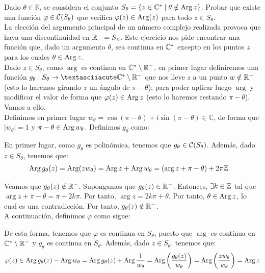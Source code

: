\begin{ejercicio}\label{ej:2.2}
    Dado $\theta \in \mathbb{R}$, se considera el conjunto $S_\theta = \{z \in \mathbb{C}^\ast \mid \theta \notin \operatorname{Arg} z\}$. Probar que existe una función $\varphi \in \mathcal{C}(S_\theta)$ que verifica $\varphi(z) \in \operatorname{Arg} (z)$ para todo $z \in S_\theta$.\\

    La elección del argumento principal de un número complejo realizada provoca que haya una discontinuidad en $\mathbb{R}^-=S_{\pi}$. Este ejercicio nos pide encontrar una función que, dado un argumento $\theta$, sea continua en $\mathbb{C}^*$ excepto en los puntos $z$ para los cuales $\theta\in \operatorname{Arg} z$.\\

    Dado $z\in S_{\theta}$, como $\arg$ es continua en $\mathbb{C}^\ast\setminus \mathbb{R}^-$, en primer lugar definiremos una función $g_{\theta}:S_{\theta}\to ´\bb{C}^{\ast}\setminus \bb{R}^-$ que nos lleve $z$ a un punto $w\notin \mathbb{R}^-$ (esto lo haremos girando $z$ un ángulo de $\pi-\theta$); para poder aplicar luego $\arg$ y modificar el valor de forma que $\varphi(z)\in \operatorname{Arg} z$ (esto lo haremos restando $\pi-\theta$). Vamos a ello.\\

    Definimos en primer lugar $w_\theta=\cos(\pi-\theta) + i\sin(\pi-\theta)\in \mathbb{C}$, de forma que $|w_\theta|=1$ y $\pi-\theta\in \operatorname{Arg} w_\theta$. Definimos $g_{\theta}$ como:

    En primer lugar, como $g_{\theta}$ es polinómica, tenemos que $g_\theta\in \mathcal{C}(S_{\theta})$. Además, dado $z\in S_{\theta}$, tenemos que:
    \begin{align*}
        \operatorname{Arg} g_{\theta}(z) &= \operatorname{Arg}(zw_\theta) = \operatorname{Arg} z + \operatorname{Arg} w_{\theta} = (\arg z + \pi-\theta)+2\pi\mathbb{Z}
    \end{align*}

    Veamos que $g_{\theta}(z)\notin \mathbb{R}^-$. Supongamos que $g_{\theta}(z)\in \mathbb{R}^-$. Entonces, $\exists k\in \mathbb{Z}$ tal que $\arg z + \pi-\theta = \pi + 2k\pi$. Por tanto, $\arg z = 2k\pi + \theta$. Por tanto, $\theta\in \operatorname{Arg} z$, lo cual es una contradicción. Por tanto, $g_{\theta}(z)\notin \mathbb{R}^-$.\\

    A continuación, definimos $\varphi$ como sigue:

    De esta forma, tenemos que $\varphi$ es continua en $S_{\theta}$, puesto que $\arg$ es continua en $\mathbb{C}^{\ast}\setminus \mathbb{R}^-$ y $g_{\theta}$ es continua en $S_{\theta}$. Además, dado $z\in S_{\theta}$, tenemos que:
    \begin{equation*}
        \varphi(z) \in \operatorname{Arg} g_{\theta}(z) - \operatorname{Arg} w_{\theta} = \operatorname{Arg} g_{\theta}(z) + \operatorname{Arg}\frac{1}{w_{\theta}} = \operatorname{Arg}\left(\frac{g_{\theta}(z)}{w_{\theta}}\right) = \operatorname{Arg}\left(\frac{zw_{\theta}}{w_{\theta}}\right) = \operatorname{Arg} z
    \end{equation*}
\end{ejercicio}

